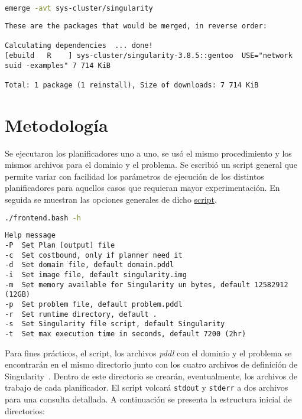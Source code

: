 \documentclass[a4paper,12pt,twocolumn]{article}
\begin{document}
\begin{lstlisting}[language=sh]
  emerge -avt sys-cluster/singularity
\end{lstlisting}
\begin{lstlisting}[style=consola]
  These are the packages that would be merged, in reverse order:

Calculating dependencies  ... done!
[ebuild   R    ] sys-cluster/singularity-3.8.5::gentoo  USE="network suid -examples" 7 714 KiB

Total: 1 package (1 reinstall), Size of downloads: 7 714 KiB
\end{lstlisting}

\section{Metodología}

Se ejecutaron los planificadores uno a uno, se usó el mismo procedimiento y los mismos archivos para el dominio y el problema. Se escribió un script general que permite variar con facilidad los parámetros de ejecución de los distintos planificadores para aquellos casos que requieran mayor experimentación. En seguida se muestran las opciones generales de dicho \href{https://gitlab.com/genomorro/unir/-/blob/RPA-01/planners/scorpion/frontend.bash}{script}.

\begin{lstlisting}[language=sh]
  ./frontend.bash -h  
\end{lstlisting}

\begin{lstlisting}[style=consola]
Help message
-P  Set Plan [output] file
-c  Set costbound, only if planner need it
-d  Set domain file, default domain.pddl
-i  Set image file, default singularity.img
-m  Set memory available for Singularity un bytes, default 12582912 (12GB)
-p  Set problem file, default problem.pddl
-r  Set runtime directory, default .
-s  Set Singularity file script, default Singularity
-t  Set max execution time in seconds, default 7200 (2hr)
\end{lstlisting}

Para fines prácticos, el script, los archivos \emph{pddl} con el dominio y el problema se encontrarán en el mismo directorio junto con los cuatro archivos de definición de Singularity~\citep[sec. Interact with images]{Sylabs_2021}. Dentro de este directorio se crearán, eventualmente, los archivos de trabajo de cada planificador.  El script volcará \texttt{stdout} y \texttt{stderr} a dos archivos para una consulta detallada. A continuación se presenta la estructura inicial de directorios:
\end{document}
